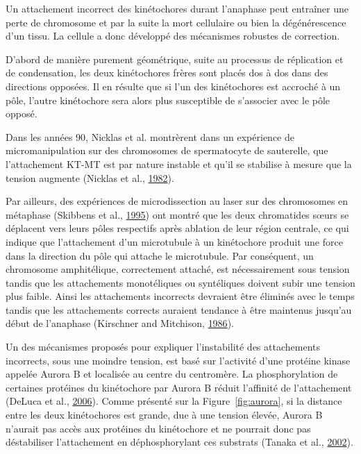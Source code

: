 \documentclass[12pt,a4paper,twoside,openright]{book}
\begin{document}
Un attachement incorrect des kinétochores durant l'anaphase peut
entraîner une perte de chromosome et par la suite la mort cellulaire ou
bien la dégénérescence d'un tissu. La cellule a donc développé des
mécanismes robustes de correction.

D'abord de manière purement géométrique, suite au processus de
réplication et de condensation, les deux kinétochores frères sont placés
dos à dos dans des directions opposées. Il en résulte que si l'un des
kinétochores est accroché à un pôle, l'autre kinétochore sera alors plus
susceptible de s'associer avec le pôle opposé.

Dans les années 90, Nicklas et al. montrèrent dans un expérience de
micromanipulation sur des chromosomes de spermatocyte de sauterelle, que
l'attachement KT-MT est par nature instable et qu'il se stabilise à
mesure que la tension augmente (Nicklas et al.,
\hyperref[ref-Nicklas1982]{1982}).

Par ailleurs, des expériences de microdissection au laser sur des
chromosomes en métaphase (Skibbens et al.,
\hyperref[ref-Skibbens1995]{1995}) ont montré que les deux chromatides
sœurs se déplacent vers leurs pôles respectifs après ablation de leur
région centrale, ce qui indique que l'attachement d'un microtubule à un
kinétochore produit une force dans la direction du pôle qui attache le
microtubule. Par conséquent, un chromosome amphitélique, correctement
attaché, est nécessairement sous tension tandis que les attachements
monotéliques ou syntéliques doivent subir une tension plus faible. Ainsi
les attachements incorrects devraient être éliminés avec le temps tandis
que les attachements corrects auraient tendance à être maintenus
jusqu'au début de l'anaphase (Kirschner and Mitchison,
\hyperref[ref-Kirschner1986]{1986}).

Un des mécanismes proposés pour expliquer l'instabilité des attachements
incorrects, sous une moindre tension, est basé sur l'activité d'une
protéine kinase appelée Aurora B et localisée au centre du centromère.
La phosphorylation de certaines protéines du kinétochore par Aurora B
réduit l'affinité de l'attachement (DeLuca et al.,
\hyperref[ref-DeLuca2006]{2006}). Comme présenté sur la
Figure~\ref{fig:aurora}, si la distance entre les deux kinétochores est
grande, due à une tension élevée, Aurora B n'aurait pas accès aux
protéines du kinétochore et ne pourrait donc pas déstabiliser
l'attachement en déphosphorylant ces substrats (Tanaka et al.,
\hyperref[ref-Tanaka2002]{2002}).
\end{document}
